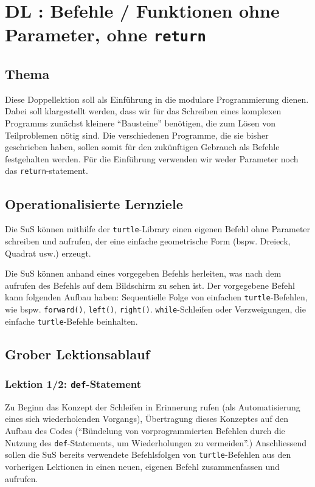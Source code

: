 \section{DL \themycounter: Befehle / Funktionen ohne Parameter, ohne \texorpdfstring{\lstinline|return|}{return}}
\begin{myExBox}[title=DL \themycounter]
\subsection*{Thema}
Diese Doppellektion soll als Einführung in die modulare Programmierung dienen. Dabei soll klargestellt werden, dass wir für das Schreiben eines komplexen Programms zunächst kleinere \enquote{Bausteine} benötigen, die zum Lösen von Teilproblemen nötig sind. Die verschiedenen Programme, die sie bisher geschrieben haben, sollen somit für den zukünftigen Gebrauch als Befehle festgehalten werden. Für die Einführung verwenden wir weder Parameter noch das \lstinline|return|-statement.

\subsection*{Operationalisierte Lernziele}
\begin{todolist}
    \item Die SuS können mithilfe der \lstinline|turtle|-Library einen eigenen Befehl ohne Parameter schreiben und aufrufen, der eine einfache geometrische Form (bspw. Dreieck, Quadrat usw.) erzeugt.
    \item Die SuS können anhand eines vorgegeben Befehls herleiten, was nach dem aufrufen des Befehls auf dem Bildschirm zu sehen ist. Der vorgegebene Befehl kann folgenden Aufbau haben: Sequentielle Folge von einfachen \lstinline|turtle|-Befehlen, wie bspw. \lstinline|forward()|, \lstinline|left()|, \lstinline|right()|. \lstinline|while|-Schleifen oder Verzweigungen, die einfache \lstinline|turtle|-Befehle beinhalten.
\end{todolist}

\subsection*{Grober Lektionsablauf}
\subsubsection*{Lektion 1/2:  \lstinline|def|-Statement}
Zu Beginn das Konzept der Schleifen in Erinnerung rufen (als Automatisierung eines sich wiederholenden Vorgangs), Übertragung dieses Konzeptes auf den Aufbau des Codes (\enquote{Bündelung von vorprogrammierten Befehlen durch die Nutzung des \lstinline|def|-Statements, um Wiederholungen zu vermeiden}.) Anschliessend sollen die SuS bereits verwendete Befehlsfolgen von \lstinline|turtle|-Befehlen aus den vorherigen Lektionen in einen neuen, eigenen Befehl zusammenfassen und aufrufen. 


\end{myExBox}
